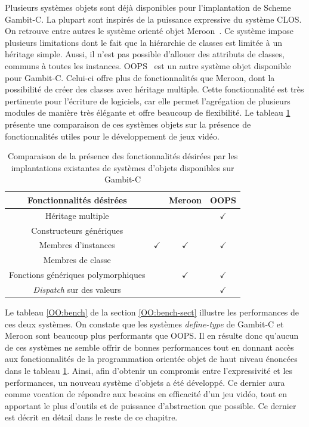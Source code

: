 \documentclass[12pt,twoside,letterpaper,francais]{book}
\newcommand{\customizedTableName}{\textsc{Tableau}}
\newcommand{\scheme}[1]{\selectlanguage{english}{\tt #1}\selectlanguage{french}}
\begin{document}
Plusieurs systèmes objets sont déjà disponibles pour l'implantation de
Scheme Gambit-C. La plupart sont inspirés de la puissance expressive
du système CLOS. On retrouve entre autres le système orienté objet
Meroon~\cite{MEROON}. Ce système impose plusieurs limitations dont le
fait que la hiérarchie de classes est limitée à un héritage
simple. Aussi, il n'est pas possible d'allouer des attributs de
classes, communs à toutes les instances. OOPS~\cite{OOPS} est un autre
système objet disponible pour Gambit-C. Celui-ci offre plus de
fonctionnalités que Meroon, dont la possibilité de créer des classes
avec héritage multiple. Cette fonctionnalité est très pertinente pour
l'écriture de logiciels, car elle permet l'agrégation de plusieurs
modules de manière très élégante et offre beaucoup de flexibilité. Le
tableau \ref{OO:fonct-comp} présente une comparaison de ces systèmes
objets sur la présence de fonctionnalités utiles pour le
dévelop\-pement de jeux vidéo.


\renewcommand{\tablename}{\customizedTableName}
\begin{table}
  \center
  \begin{tabular}{|c|c|c|c|}
    \hline
    Fonctionnalités désirées           & \scheme{define-type} & Meroon & OOPS\\
    \hline \hline
    Héritage multiple                   &  &  & $\checkmark$\\
    \hline
    Constructeurs génériques            &  &  &  \\
    \hline
    Membres d'instances       & $\checkmark$ & $\checkmark$ & $\checkmark$\\
    \hline
    Membres de classe                   &                      &         &  \\
    \hline
    Fonctions génériques polymorphiques & & $\checkmark$ & $\checkmark$\\
    \hline
    \textit{Dispatch} sur des valeurs   & & & $\checkmark$\\
    \hline
  \end{tabular}
  \caption{Comparaison de la présence des fonctionnalités désirées par
    les implantations existantes de systèmes d'objets disponibles sur
    Gambit-C}
  \label{OO:fonct-comp}
\end{table}

Le tableau \ref{OO:bench} de la section \ref{OO:bench-sect} illustre
les performances de ces deux systèmes. On constate que les systèmes
\textit{define-type} de Gambit-C et Meroon sont beaucoup plus
performants que OOPS. Il en résulte donc qu'aucun de ces systèmes ne
semble offrir de bonnes performances tout en donnant accès aux
fonctionnalités de la programmation orientée objet de haut niveau
énoncées dans le tableau \ref{OO:fonct-comp}. Ainsi, afin d'obtenir un
compromis entre l'expressivité et les performances, un nouveau système
d'objets a été développé. Ce dernier aura comme vocation de répondre
aux besoins en efficacité d'un jeu vidéo, tout en apportant le plus
d'outils et de puissance d'abstraction que possible. Ce dernier est
décrit en détail dans le reste de ce chapitre.
\end{document}
